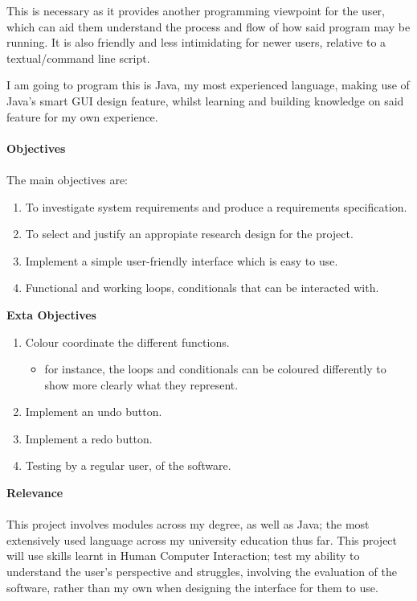 \documentclass[a4paper, 12pt]{article}
\begin{document}
            This is necessary as it provides another programming viewpoint for the user,
            which can aid them understand the process and flow of how said program may be running.
            It is also friendly and less intimidating for newer users, relative to a textual/command
            line script.
                
            I am going to program this is Java, my most experienced language, making use of Java's
            smart GUI design feature, whilst learning and building knowledge on said feature for my
            own experience. \\\\
            \textbf{Objectives} \\\\
            The main objectives are:
            \begin{enumerate}
                \item To investigate system requirements and produce a requirements specification.
                \item To select and justify an appropiate research design for the project.
                \item Implement a simple user-friendly interface which is easy to use.
                \item Functional and working loops, conditionals that can be interacted
                with. \\
            \end{enumerate}        
            \textbf{Exta Objectives}
            \begin{enumerate}
                \item Colour coordinate the different functions.
                \begin{itemize}
                    \item for instance, the loops and conditionals can be coloured differently to show more
                    clearly what they represent.
                \end{itemize}
                \item Implement an undo button.
                \item Implement a redo button.
                \item Testing by a regular user, of the software.
            \end{enumerate}
            \textbf{Relevance} \\\\
            This project involves modules across my degree, as well as Java; the most extensively
            used language across my university education thus far. This project will use skills learnt
            in Human Computer Interaction; test my ability to understand the user's perspective and
            struggles, involving the evaluation of the software, rather than my own when designing
            the interface for them to use.
        
\end{document}
